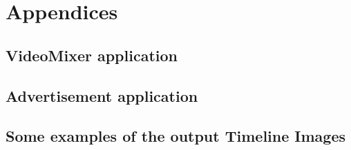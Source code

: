 \appendix
\chapter*{Appendices}\label{chap:Appendices}
\setcounter{chapter}{1}  %
\setcounter{equation}{0} 

\section{VideoMixer application}


\clearpage\section{Advertisement application}


\clearpage\section{Some examples of the output Timeline Images}\label{app:TIs}


